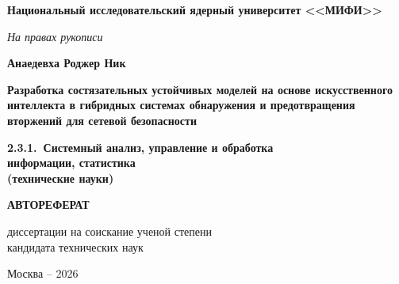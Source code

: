 \documentclass[12pt,a5paper]{article}
\begin{document}
\sloppy

\thispagestyle{empty}

\begin{center}
\textbf{Национальный исследовательский ядерный университет <<МИФИ>>}

\vspace{1cm}

\textit{На правах рукописи}

\vspace{2cm}

\textbf{Анаедевха Роджер Ник}

\vspace{1.5cm}

{\large \textbf{Разработка состязательных устойчивых
моделей на основе искусственного интеллекта в гибридных
системах обнаружения и предотвращения вторжений для
сетевой безопасности}}

\vspace{1.5cm}

\textbf{2.3.1.\ Системный анализ, управление и обработка\\
информации, статистика\\
(технические науки)}

\vspace{2cm}

\textbf{АВТОРЕФЕРАТ}

\vspace{0.5cm}

диссертации на соискание ученой степени\\
кандидата технических наук

\vfill

Москва -- 2026
\end{center}

\newpage

\thispagestyle{empty}
\enlargethispage{1cm}
\end{document}
